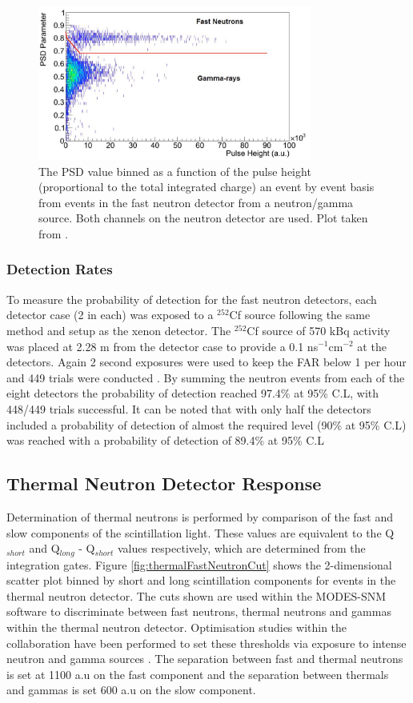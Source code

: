 \begin{figure}[htbp]
\begin{center}
\includegraphics[width=90mm]{Chapter8/figures/psdCut.pdf}
\caption{The PSD value binned as a function of the pulse height (proportional to the total integrated charge) an event by event basis from events in the fast neutron detector from a neutron/gamma source. Both channels on the neutron detector are used. Plot taken from \cite{modesInternal}.}
\label{fig:neutronPsdCut}
\end{center}
\end{figure}

\subsubsection{Detection Rates}
To measure the probability of detection for the fast neutron detectors, each detector case (2 in each) was exposed to a $^{252}$Cf source following the same method and setup as the xenon detector. The $^{252}$Cf source of 570 kBq activity was placed at 2.28 m from the detector case to provide a 0.1 ns$^{-1}$cm$^{-2}$ at the detectors. Again 2 second exposures were used to keep the FAR below 1 per hour and 449 trials were conducted \cite{modesInternal}. By summing the neutron events from each of the eight detectors the probability of detection reached 97.4\% at 95\% C.L, with 448/449 trials successful. It can be noted that with only half the detectors included a probability of detection of almost the required level (90\% at 95\% C.L) was reached with a probability of detection of 89.4\% at 95\% C.L \cite{modesInternal}

\subsection{Thermal Neutron Detector Response}
Determination of thermal neutrons is performed by comparison of the fast and slow components of the scintillation light. These values are equivalent to the Q$_{short}$ and Q$_{long}$ - Q$_{short}$ values respectively, which are determined from the integration gates. Figure \ref{fig:thermalFastNeutronCut} shows the 2-dimensional scatter plot binned by short and long scintillation components for events in the thermal neutron detector. The cuts shown are used within the MODES-SNM software to discriminate between fast neutrons, thermal neutrons and gammas within the thermal neutron detector. Optimisation studies within the collaboration have been performed to set these thresholds via exposure to intense neutron and gamma sources \cite{modesInternal}. The separation between fast and thermal neutrons is set at 1100 a.u on the fast component and the separation between thermals and gammas is set 600 a.u on the slow component. 

